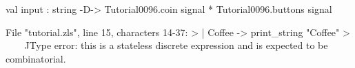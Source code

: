 \runverbatimfalse
{}
\begin{RunVerbatimMsg}
val input :
  string -D-> Tutorial0096.coin signal * Tutorial0096.buttons signal
\end{RunVerbatimMsg}
\begin{RunVerbatimErr}
File "tutorial.zls", line 15, characters 14-37:
>  | Coffee -> print_string "Coffee\n"
>              ^^^^^^^^^^^^^^^^^^^^^^^
Type error: this is a stateless discrete expression and is expected to be combinatorial.
\end{RunVerbatimErr}

